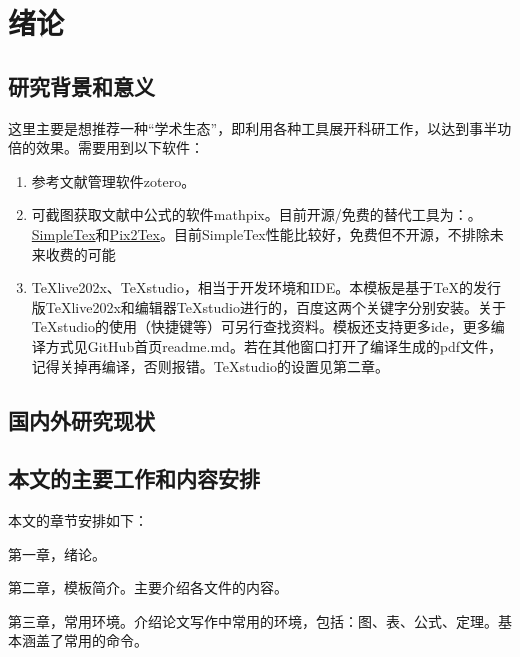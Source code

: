 \chapter{绪论}
%
\section{研究背景和意义}
%

这里主要是想推荐一种“学术生态”，即利用各种工具展开科研工作，以达到事半功倍的效果。需要用到以下软件：
\begin{enumerate}[topsep = 0 pt, itemsep= 0 pt, parsep=0pt, partopsep=0pt, leftmargin=44pt, itemindent=0pt, labelsep=6pt, label=(\arabic*)]
	\item 	参考文献管理软件zotero\cite{_m}。
	\item	可截图获取文献中公式的软件mathpix\cite{_h}。目前开源/免费的替代工具为：。\href{https://www.simpletex.cn/}{SimpleTex}和\href{https://p2t.breezedeus.com/}{Pix2Tex}。目前SimpleTex性能比较好，免费但不开源，不排除未来收费的可能
	\item	TeXlive202x、TeXstudio，相当于开发环境和IDE。本模板是基于TeX的发行版TeXlive202x和编辑器TeXstudio进行的，百度这两个关键字分别安装。关于TeXstudio的使用（快捷键等）可另行查找资料。模板还支持更多ide，更多编译方式见GitHub首页readme.md。若在其他窗口打开了编译生成的pdf文件，记得关掉再编译，否则报错。TeXstudio的设置见第二章。
\end{enumerate}

\section{国内外研究现状}
\section{本文的主要工作和内容安排}

本文的章节安排如下：

第一章，绪论。

第二章，模板简介。主要介绍各文件的内容。

第三章，常用环境。介绍论文写作中常用的环境，包括：图、表、公式、定理。基本涵盖了常用的命令。



